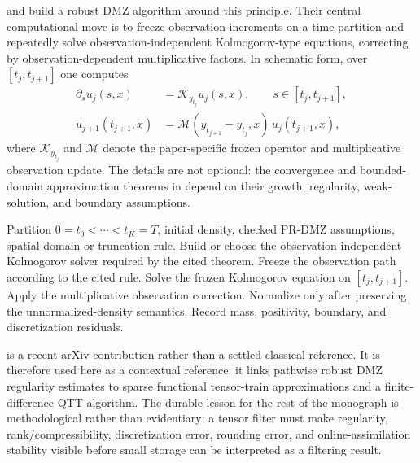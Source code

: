 \citet{yau2000realtime} and \citet{yau2008realtime} build a robust DMZ
algorithm around this principle.  Their central computational move is to
freeze observation increments on a time partition and repeatedly solve
observation-independent Kolmogorov-type equations, correcting by
observation-dependent multiplicative factors.  In schematic form, over
$[t_j,t_{j+1}]$ one computes
\begin{align}
  \partial_s u_j(s,x) &= \mathcal K_{y_{t_j}} u_j(s,x),
       \qquad s\in[t_j,t_{j+1}], \label{eq:bf-hd-frozen-kolmogorov}\\
  u_{j+1}(t_{j+1},x) &=
       \mathcal M(y_{t_{j+1}}-y_{t_j},x)\,u_j(t_{j+1},x),
       \label{eq:bf-hd-memoryless-update}
\end{align}
where $\mathcal K_{y_{t_j}}$ and $\mathcal M$ denote the paper-specific frozen
operator and multiplicative observation update.  The details are not optional:
the convergence and bounded-domain approximation theorems in
\citet{yau2000realtime,yau2008realtime} depend on their growth, regularity,
weak-solution, and boundary assumptions.

\begin{algorithm}
\caption{Robust DMZ offline/online template}
\label{alg:bf-hd-robust-dmz}
\begin{algorithmic}[1]
\Require Partition $0=t_0<\cdots<t_K=T$, initial density, checked PR-DMZ
  assumptions, spatial domain or truncation rule.
\State Build or choose the observation-independent Kolmogorov solver required by
  the cited theorem.
  \State Freeze the observation path according to the cited rule.
  \State Solve the frozen Kolmogorov equation on $[t_j,t_{j+1}]$.
  \State Apply the multiplicative observation correction.
  \State Normalize only after preserving the unnormalized-density semantics.
  \State Record mass, positivity, boundary, and discretization residuals.
\EndFor
\end{algorithmic}
\end{algorithm}

\citet{meng2025regularity} is a recent arXiv contribution rather than a settled
classical reference.  It is therefore used here as a contextual reference: it
links pathwise robust DMZ regularity estimates to sparse functional
tensor-train approximations and a finite-difference QTT algorithm.  The
durable lesson for the rest of the monograph is methodological rather than evidentiary: a tensor
filter must make regularity, rank/compressibility, discretization error,
rounding error, and online-assimilation stability visible before small storage
can be interpreted as a filtering result.

